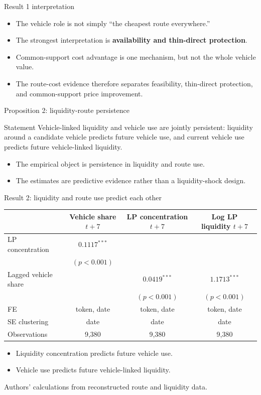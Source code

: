 \documentclass[aspectratio=169,11pt]{beamer}
\newcommand{\source}[1]{\vfill {\tiny\textcolor{DVCGrey}{#1}}}
\newcommand{\key}[1]{\textcolor{DVCBlue}{\textbf{#1}}}
\begin{document}
\begin{frame}{Result 1 interpretation}
\begin{itemize}
  \item The vehicle role is not simply ``the cheapest route everywhere.''
  \item The strongest interpretation is \key{availability and thin-direct protection}.
  \item Common-support cost advantage is one mechanism, but not the whole vehicle value.
  \item The route-cost evidence therefore separates feasibility, thin-direct protection, and common-support price improvement.
\end{itemize}
\end{frame}

\begin{frame}{Proposition 2: liquidity-route persistence}
\begin{block}{Statement}
Vehicle-linked liquidity and vehicle use are jointly persistent: liquidity around a candidate vehicle predicts future vehicle use, and current vehicle use predicts future vehicle-linked liquidity.
\end{block}
\vspace{0.6em}
\begin{itemize}
  \item The empirical object is persistence in liquidity and route use.
  \item The estimates are predictive evidence rather than a liquidity-shock design.
\end{itemize}
\end{frame}

\begin{frame}{Result 2: liquidity and route use predict each other}
\scriptsize
\begin{tabular}{lccc}
\toprule
 & Vehicle share $t+7$ & LP concentration $t+7$ & Log LP liquidity $t+7$ \\
\midrule
LP concentration & $0.1117^{***}$ & & \\
 & $(p<0.001)$ & & \\
Lagged vehicle share & & $0.0419^{***}$ & $1.1713^{***}$ \\
 & & $(p<0.001)$ & $(p<0.001)$ \\
\midrule
FE & token, date & token, date & token, date \\
SE clustering & date & date & date \\
Observations & 9,380 & 9,380 & 9,380 \\
\bottomrule
\end{tabular}
\vspace{0.8em}
\begin{itemize}
  \item Liquidity concentration predicts future vehicle use.
  \item Vehicle use predicts future vehicle-linked liquidity.
\end{itemize}
\source{Authors' calculations from reconstructed route and liquidity data.}
\end{frame}
\end{document}
